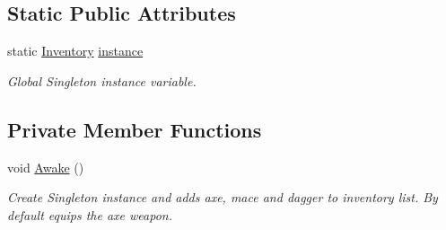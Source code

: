 \subsection*{Static Public Attributes}
\begin{DoxyCompactItemize}
\item 
static \mbox{\hyperlink{class_inventory}{Inventory}} \mbox{\hyperlink{class_inventory_ae88b8381f35fc496d2b9db36b09b962b}{instance}}
\begin{DoxyCompactList}\small\item\em Global Singleton instance variable. \end{DoxyCompactList}\end{DoxyCompactItemize}
\subsection*{Private Member Functions}
\begin{DoxyCompactItemize}
\item 
void \mbox{\hyperlink{class_inventory_a88da279faf84d529af011f7e25bea01b}{Awake}} ()
\begin{DoxyCompactList}\small\item\em Create Singleton instance and adds axe, mace and dagger to inventory list. By default equips the axe weapon. \end{DoxyCompactList}\end{DoxyCompactItemize}
